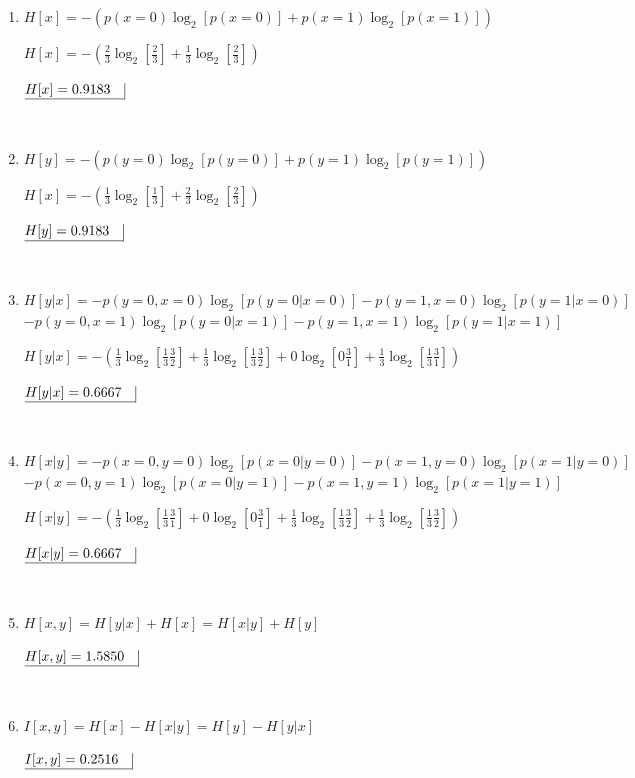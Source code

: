 \begin{enumerate}
\begin{enumerate}
    \item $H[x]= -\left( p(x=0)\log_2[p(x=0)] + p(x=1)\log_2[p(x=1)] \right)$
    
    $H[x]= -\left( \frac{2}{3} \log_2[\frac{2}{3}] + \frac{1}{3}\log_2[\frac{2}{3}] \right)$

    $\underline{H[x]=0.9183 \quad} \vline$
    
    $ $

    \item $H[y]= -\left( p(y=0)\log_2[p(y=0)] + p(y=1)\log_2[p(y=1)] \right)$
    
    $H[x]= -\left( \frac{1}{3} \log_2[\frac{1}{3}] + \frac{2}{3}\log_2[\frac{2}{3}] \right)$

    $\underline{H[y]=0.9183 \quad} \vline$
     
    $ $

    \item $H[y|x] = -p(y=0,x=0)\log_2[p(y=0|x=0)] - p(y=1,x=0)\log_2[p(y=1|x=0)]$
    $- p(y=0,x=1)\log_2[p(y=0|x=1)] - p(y=1,x=1)\log_2[p(y=1|x=1)]$ 
    
    $H[y|x] = -\left( \frac{1}{3}\log_2[\frac{1}{3}\frac{3}{2}] + \frac{1}{3}\log_2[\frac{1}{3}\frac{3}{2}] + 0\log_2[0\frac{3}{1}] + \frac{1}{3}\log_2[\frac{1}{3}\frac{3}{1}] \right)$ 

    $\underline{H[y|x]=0.6667 \quad} \vline$
     
    $ $

    \item $H[x|y] = -p(x=0,y=0)\log_2[p(x=0|y=0)] - p(x=1,y=0)\log_2[p(x=1|y=0)]$
    $ - p(x=0,y=1)\log_2[p(x=0|y=1)] - p(x=1,y=1)\log_2[p(x=1|y=1)]$ 
    
    $H[x|y] = -\left( \frac{1}{3}\log_2[\frac{1}{3}\frac{3}{1}] + 0\log_2[0\frac{3}{1}] + \frac{1}{3}\log_2[\frac{1}{3}\frac{3}{2}] + \frac{1}{3}\log_2[\frac{1}{3}\frac{3}{2}] \right)$ 

    $\underline{H[x|y]=0.6667 \quad} \vline$
     
    $ $
    
    \item $H[x,y] = H[y|x] + H[x] = H[x|y] + H[y]$
    
    $\underline{H[x,y]=1.5850 \quad} \vline$
     
    $ $
    
    \item $I[x,y] = H[x] - H[x|y] = H[y] - H[y|x]$
    
    $\underline{I[x,y]=0.2516 \quad} \vline$
         

\end{enumerate}
\end{enumerate}
